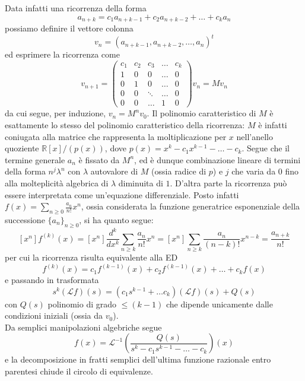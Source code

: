 \documentclass[a4paper,twoside]{article}
\newcommand{\R}{\mathbb{R}}
\theoremstyle{definition}
\numberwithin{theorem}{section}
\begin{document}
Data infatti una ricorrenza della forma 
$$ a_{n+k} = c_1 a_{n+k-1} + c_2 a_{n+k-2} + \ldots + c_k a_n $$
possiamo definire il vettore colonna 
$$ v_n = \left(a_{n+k-1},a_{n+k-2},\ldots,a_n\right)^t $$
ed esprimere la ricorrenza come 
$$ v_{n+1} = \begin{pmatrix}c_1 & c_2 & c_3 & \ldots & c_k \\ 
                            1 & 0 & 0 &\ldots & 0 \\
                            0 & 1 & 0 &\ldots & 0 \\
                            0 & 0 & \ddots & \ldots & 0 \\
                            0 & 0 & \ldots & 1 & 0\end{pmatrix} v_n = M v_n $$
da cui segue, per induzione, $v_n = M^n v_0$. Il polinomio caratteristico di $M$ è esattamente lo stesso del polinomio caratteristico della ricorrenza: $M$ è infatti coniugata alla matrice che rappresenta la moltiplicazione per $x$ nell'anello quoziente $\R[x]/(p(x))$, dove $p(x)=x^k-c_1 x^{k-1}-\ldots-c_k$. Segue che il termine generale $a_n$ è fissato da $M^n$, ed è dunque combinazione lineare di termini della forma $n^j \lambda^n$ con $\lambda$ autovalore di $M$ (ossia radice di $p$) e $j$ che varia da $0$ fino alla molteplicità algebrica di $\lambda$ diminuita di $1$. D'altra parte la ricorrenza può essere interpretata come un'equazione differenziale. Posto infatti $f(x)=\sum_{n\geq 0}\frac{a_n}{n!}x^n$, ossia considerata la funzione generatrice esponenziale della successione $\{a_n\}_{n\geq 0}$, si ha quanto segue:
$$ [x^n]f^{(k)}(x) = [x^n]\frac{d^k}{dx^k}\sum_{n\geq k}\frac{a_n}{n!}x^n=[x^n]\sum_{n\geq k}\frac{a_n}{(n-k)!}x^{n-k}=\frac{a_{n+k}}{n!}$$
per cui la ricorrenza risulta equivalente alla ED
$$ f^{(k)}(x) = c_1 f^{(k-1)}(x) + c_2 f^{(k-1)}(x) + \ldots + c_k f(x) $$
e passando in trasformata 
$$ s^k (\mathcal{L}f)(s) = \left(c_1 s^{k-1}+\ldots c_k\right)(\mathcal{L}f)(s)+Q(s) $$
con $Q(s)$ polinomio di grado $\leq (k-1)$ che dipende unicamente dalle condizioni iniziali (ossia da $v_0$).\\
Da semplici manipolazioni algebriche segue 
$$ f(x) = \mathcal{L}^{-1}\left(\frac{Q(s)}{s^k-c_1 s^{k-1}-\ldots-c_k}\right)(x) $$
e la decomposizione in fratti semplici dell'ultima funzione razionale entro parentesi chiude il circolo di equivalenze.
\end{document}
